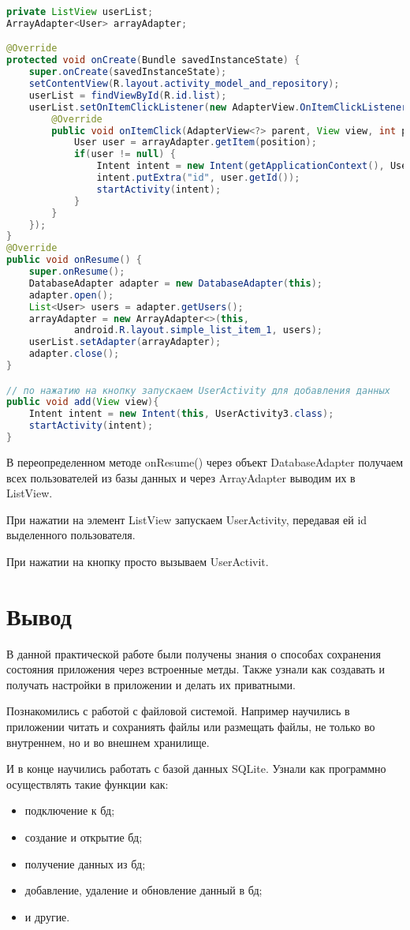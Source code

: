 \begin{lstlisting}[language=Java
	, label=lst:
	]
private ListView userList;
ArrayAdapter<User> arrayAdapter;

@Override
protected void onCreate(Bundle savedInstanceState) {
	super.onCreate(savedInstanceState);
	setContentView(R.layout.activity_model_and_repository);
	userList = findViewById(R.id.list);
	userList.setOnItemClickListener(new AdapterView.OnItemClickListener() {
		@Override
		public void onItemClick(AdapterView<?> parent, View view, int position, long id) {
			User user = arrayAdapter.getItem(position);
			if(user != null) {
				Intent intent = new Intent(getApplicationContext(), UserActivity3.class);
				intent.putExtra("id", user.getId());
				startActivity(intent);
			}
		}
	});
}
@Override
public void onResume() {
	super.onResume();
	DatabaseAdapter adapter = new DatabaseAdapter(this);
	adapter.open();
	List<User> users = adapter.getUsers();
	arrayAdapter = new ArrayAdapter<>(this,
			android.R.layout.simple_list_item_1, users);
	userList.setAdapter(arrayAdapter);
	adapter.close();
}

// по нажатию на кнопку запускаем UserActivity для добавления данных
public void add(View view){
	Intent intent = new Intent(this, UserActivity3.class);
	startActivity(intent);
}
\end{lstlisting}

В переопределенном методе onResume() через объект DatabaseAdapter
получаем всех пользователей из базы данных и через ArrayAdapter выводим
их в ListView.\par
При нажатии на элемент ListView запускаем UserActivity, передавая ей id
выделенного пользователя.\par
При нажатии на кнопку просто вызываем UserActivit.

\clearpage

\section*{\LARGE{Вывод}}
В данной практической работе были получены знания о способах
сохранения состояния приложения через встроенные метды.
Также узнали как создавать и получать настройки в приложении и делать
их приватными.\par
Познакомились с работой с файловой системой. Например научились
в приложении читать и сохраниять файлы или размещать файлы,
не только во внутреннем, но и во внешнем хранилище.\par
И в конце научились работать с базой данных SQLite.
Узнали как программно осуществлять такие функции как:

\begin{itemize}
	\item подключение к бд;
	\item создание и открытие бд;
	\item получение данных из бд;
	\item добавление, удаление и обновление данный в бд;
	\item и другие.
\end{itemize}

